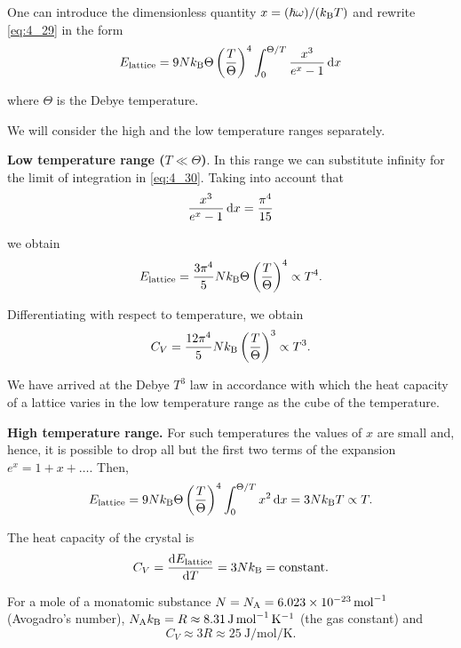 One can introduce the dimensionless quantity $x=(\hslash\omega)/(k_{\text{B}}T)$ and rewrite \eqref{eq:4_29} in the form
\begin{equation}\label{eq:4_30}
    E_{\text{lattice}} = 9N k_{\text{B}} \Theta \left(\frac{T}{\Theta}\right)^4 \int_0^{\Theta/T} \frac{x^3}{e^x - 1}\, \mathrm{d} x
\end{equation}

\noindent
where $\Theta$ is the Debye temperature.

We will consider the high and the low temperature ranges separately.

\textbf{Low temperature range ($T\ll\Theta$)}. In this range we can substitute infinity for the limit of integration in \eqref{eq:4_30}. Taking into account that
\begin{equation*}
    \frac{x^3}{e^x - 1}\, \mathrm{d} x = \frac{\pi^4}{15}
\end{equation*}

\noindent
we obtain
\begin{equation}\label{eq:4_31}
    E_{\text{lattice}} = \frac{3\pi^4}{5} N k_{\text{B}} \Theta \left(\frac{T}{\Theta}\right)^4 \propto T^4.
\end{equation}

\noindent
Differentiating  with respect to temperature, we obtain
\begin{equation}\label{eq:4_32}
    C_V = \frac{12\pi^4}{5} N k_{\text{B}} \left(\frac{T}{\Theta}\right)^3 \propto T^3.
\end{equation}

\noindent
We have arrived at the Debye $T^3$ law in accordance with which the heat capacity of a lattice varies in the low temperature range as the cube of the temperature.

\textbf{High temperature range.} For such temperatures the values of $x$ are small and, hence, it is possible to drop all but the first two terms of the expansion $e^x=1+x+\ldots$. Then,
\begin{equation}\label{eq:4_33}
    E_{\text{lattice}} = 9N k_{\text{B}} \Theta \left(\frac{T}{\Theta}\right)^4 \int_0^{\Theta/T} x^2\, \mathrm{d} x = 3N k_{\text{B}} T \propto T.
\end{equation}

\noindent
The heat capacity of the crystal is
\begin{equation}\label{eq:4_34}
    C_V = \dfrac{\mathrm{d}E_{\text{lattice}}}{\mathrm{d} T} = 3N k_{\text{B}} = \text{constant}.
\end{equation}

For a mole of a monatomic substance $N=N_{\text{A}}=\SI{6.023e-23}{\per\mole}$ (Avogadro's number), $N_{\text{A}}k_{\text{B}}=R\approx\SI{8.31}{\joule\per\mole\per\kelvin}$ (the gas constant) and
\begin{equation}\label{eq:4_35}
    C_V \approx 3R \approx \SI{25}{\joule\per\mole\per\kelvin}.
\end{equation}

